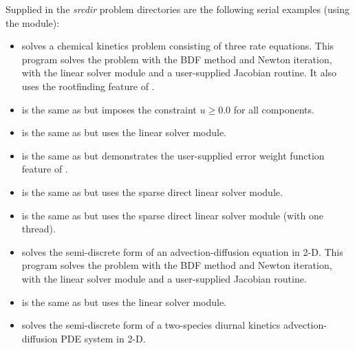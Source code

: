 
\vspace{0.2in}\noindent
Supplied in the {\em srcdir} problem directories are the
following serial examples (using the {\nvecs} module):

\begin{itemize}


\item {}
  solves a chemical kinetics problem consisting of three rate equations.
  \newline
  This program solves the problem with the BDF method and Newton          
  iteration, with the {\sunlinsoldense} linear solver module and a user-supplied    
  Jacobian routine.  It also uses the rootfinding feature of {\cvodes}.
\item {}
  is the same as  but imposes the constraint
  $u \geq 0.0$ for all components.
\item {}
  is the same as  but uses the
  {\sunlinsollapdense} linear solver module.
\item {}
  is the same as  but demonstrates the user-supplied error
  weight function feature of {\cvodes}.
\item {}
  is the same as  but uses the {\sunlinsolklu}
  sparse direct linear solver module.
\item {}
  is the same as  but uses the
  {\sunlinsolslumt} sparse direct linear solver module (with one thread).
\item {}
  solves the semi-discrete form of an advection-diffusion equation in 2-D. 
  \newline
  This program solves the problem with the BDF method and Newton          
  iteration, with the {\sunlinsolband} linear solver module and a user-supplied     
  Jacobian routine.
\item {}
  is the same as  but uses the {\sunlinsollapband}
  linear solver module.
\item {}
  solves the semi-discrete form of a two-species diurnal kinetics
  advection-diffusion PDE system in 2-D.

\end{itemize}
